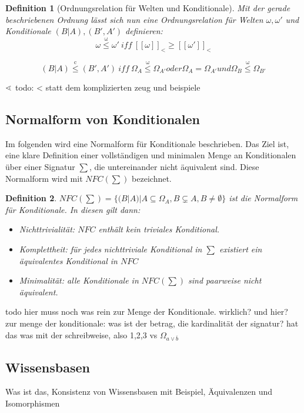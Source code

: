 \documentclass[12pt,a4paper]{article}
\newtheorem{theorem}{Definition}
\newcommand\dotl{\mathrel{%
    \mathchoice{\QEQ}{\QEQ}{\scriptsize\QEQ}{\tiny\QEQ}%
}}
\def\QEQ{{%
    \setbox0\hbox{<}%
    \rlap{\hbox to \wd0{\hss$\ \cdot$\hss}}\box0
}}
\begin{document}
\begin{theorem}[Ordnungsrelation für Welten und Konditionale]
Mit der gerade beschriebenen Ordnung lässt sich nun eine Ordnungsrelation für Welten $\omega, \omega'$ und Konditionale $ (B|A), (B',A')$ definieren:
\begin{equation}
\omega \overset{\mathrm{\omega}}{\leq} \omega' \ iff \ [[\omega]]_< \geq [[\omega']]_<
\end{equation}

\begin{equation}
(B|A) \overset{\mathrm{c}}{\leq} (B',A') \ iff \ \Omega_A \overset{\mathrm{\omega}}{\leq} \Omega_{A'} oder \Omega_A =  \Omega_{A'} und \Omega_B \overset{\mathrm{\omega}}{\leq} \Omega_{B'}
\end{equation}

\end{theorem}
$ \dotl $
todo: < statt dem komplizierten zeug und beispiele
\subsection{Normalform von Konditionalen}
Im folgenden wird eine Normalform für Konditionale beschrieben. Das Ziel ist, eine klare Definition einer vollständigen und minimalen  Menge an Konditionalen über einer Signatur $\sum$, die untereinander nicht äquivalent sind. Diese Normalform wird mit $NFC(\sum)$ bezeichnet.
\begin{theorem}
$NFC(\sum) = \{(B|A)|A \subseteq
 \Omega_A, B \subsetneq A, B \neq \emptyset \}$ ist die Normalform für Konditionale. In diesen gilt dann:
 \begin{itemize}
\item{Nichttrivialität: $NFC$ enthält kein triviales Konditional.}
\item{Komplettheit: für jedes nichttriviale Konditional in $\sum$ existiert ein äquivalentes Konditional in $NFC$ }
\item{Minimalität: alle Konditionale in $NFC(\sum)$ sind paarweise nicht äquivalent.}
  \end{itemize}

\end{theorem}
 todo hier muss noch was rein zur Menge der Konditionale. wirklich? und hier? \\
 zur menge der konditionale: was ist der betrag, die kardinalität der signatur? hat das was mit der schreibweise, also {1,2,3} vs $\Omega_{a\vee \overline{b}}$
\subsection{Wissensbasen}
Was ist das, Konsistenz von Wissensbasen mit Beispiel, Äquivalenzen und Isomorphismen
\end{document}
